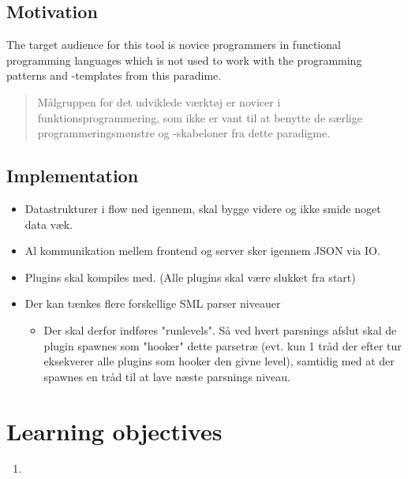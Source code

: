 \documentclass[a4paper,oneside]{memoir}
\begin{document}
\subsection{Motivation}

The target audience for this tool is novice programmers in functional
programming languages which is not used to work with the programming patterns
and -templates from this paradime. 

\begin{quotation}
  Målgruppen for det udviklede værktøj er novicer i funktionsprogrammering, som
  ikke er vant til at benytte de særlige programmeringsmønstre og -skabeloner
  fra dette paradigme.
\end{quotation}



\subsection{Implementation}


\begin{itemize}
\item Datastrukturer i flow ned igennem, skal bygge videre og ikke smide noget
  data væk.

\item Al kommunikation mellem frontend og server sker igennem JSON via IO.

\item Plugins skal kompiles med. (Alle plugins skal være slukket fra start)


\item Der kan tænkes flere forskellige SML parser niveauer 
  \begin{itemize}

  \item Der skal derfor indføres "runlevels". Så ved hvert parsnings afslut skal
    de plugin spawnes som "hooker" dette parsetræ (evt. kun 1 tråd der efter tur
    eksekverer alle plugins som hooker den givne level), samtidig med at der
    spawnes en tråd til at lave næste parsnings niveau.
  \end{itemize}
\end{itemize}

\section{Learning objectives}

\begin{enumerate}
\item 
\end{enumerate}
\end{document}

